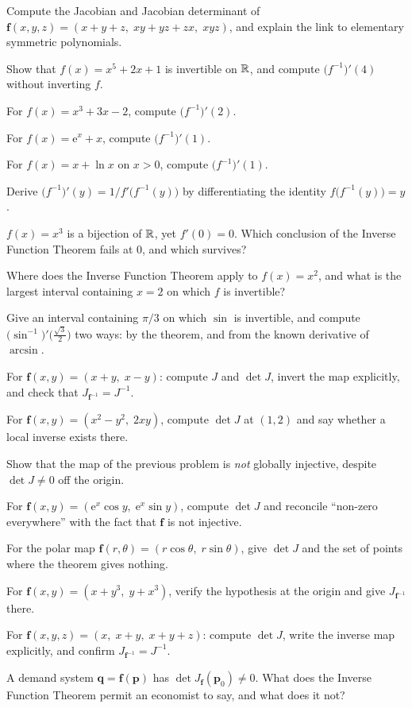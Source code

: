 \begin{problems}
  \item Compute the Jacobian and Jacobian determinant of
        $\mathbf{f}(x,y,z)=(x+y+z,\;xy+yz+zx,\;xyz)$, and explain the link
        to elementary symmetric polynomials.
  \item Show that $f(x)=x^{5}+2x+1$ is invertible on $\mathbb{R}$, and compute
        $\bigl(f^{-1}\bigr)'(4)$ without inverting $f$.
  \item For $f(x)=x^{3}+3x-2$, compute $\bigl(f^{-1}\bigr)'(2)$.
  \item For $f(x)=\mathrm{e}^{x}+x$, compute $\bigl(f^{-1}\bigr)'(1)$.
  \item For $f(x)=x+\ln x$ on $x>0$, compute $\bigl(f^{-1}\bigr)'(1)$.
  \item Derive $\bigl(f^{-1}\bigr)'(y)=1/f'\bigl(f^{-1}(y)\bigr)$ by
        differentiating the identity $f\bigl(f^{-1}(y)\bigr)=y$.
  \item $f(x)=x^{3}$ is a bijection of $\mathbb{R}$, yet $f'(0)=0$. Which
        conclusion of the Inverse Function Theorem fails at $0$, and which
        survives?
  \item Where does the Inverse Function Theorem apply to $f(x)=x^{2}$, and
        what is the largest interval containing $x=2$ on which $f$ is
        invertible?
  \item Give an interval containing $\pi/3$ on which $\sin$ is invertible,
        and compute $\bigl(\sin^{-1}\bigr)'\bigl(\tfrac{\sqrt3}{2}\bigr)$
        two ways: by the theorem, and from the known derivative of
        $\arcsin$.
  \item For $\mathbf{f}(x,y)=(x+y,\;x-y)$: compute $J$ and $\det J$, invert
        the map explicitly, and check that $J_{\mathbf{f}^{-1}}=J^{-1}$.
  \item For $\mathbf{f}(x,y)=(x^{2}-y^{2},\;2xy)$, compute $\det J$ at
        $(1,2)$ and say whether a local inverse exists there.
  \item Show that the map of the previous problem is \emph{not} globally
        injective, despite $\det J\neq0$ off the origin.
  \item For $\mathbf{f}(x,y)=(\mathrm{e}^{x}\cos y,\;\mathrm{e}^{x}\sin y)$,
        compute $\det J$ and reconcile ``non-zero everywhere'' with the fact
        that $\mathbf{f}$ is not injective.
  \item For the polar map
        $\mathbf{f}(r,\theta)=(r\cos\theta,\;r\sin\theta)$, give $\det J$
        and the set of points where the theorem gives nothing.
  \item For $\mathbf{f}(x,y)=(x+y^{3},\;y+x^{3})$, verify the hypothesis at
        the origin and give $J_{\mathbf{f}^{-1}}$ there.
  \item For $\mathbf{f}(x,y,z)=(x,\;x+y,\;x+y+z)$: compute $\det J$, write
        the inverse map explicitly, and confirm
        $J_{\mathbf{f}^{-1}}=J^{-1}$.
  \item A demand system $\mathbf{q}=\mathbf{f}(\mathbf{p})$ has
        $\det J_{\mathbf{f}}(\mathbf{p}_{0})\neq0$. What does the Inverse
        Function Theorem permit an economist to say, and what does it not?
\end{problems}

